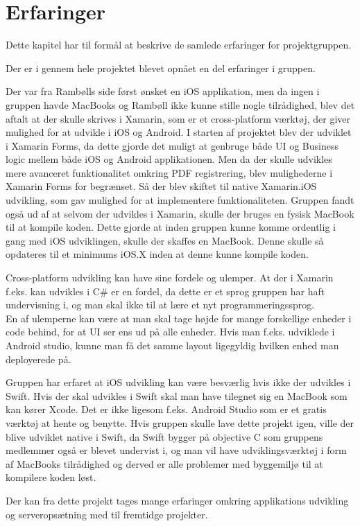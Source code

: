 \chapter{Erfaringer}
Dette kapitel har til formål at beskrive de samlede erfaringer for projektgruppen. 

Der er i gennem hele projektet blevet opnået en del erfaringer i gruppen.

Der var fra Rambølls side først ønsket en iOS applikation, men da ingen i gruppen havde MacBooks og Rambøll ikke kunne stille nogle tilrådighed, blev det aftalt at der skulle skrives i Xamarin, som er et cross-platform værktøj, der giver mulighed for at udvikle i iOS og Android.
I starten af projektet blev der udviklet i Xamarin Forms, da dette gjorde det muligt at genbruge både UI og Business logic mellem både iOS og Android applikationen. Men da der skulle udvikles mere avanceret funktionalitet omkring PDF registrering, blev mulighederne i Xamarin Forms for begrænset\cite{Forms}. Så der blev skiftet til native Xamarin.iOS udvikling, som gav mulighed for at implementere funktionaliteten.
Gruppen fandt også ud af at selvom der udvikles i Xamarin, skulle der bruges en fysisk MacBook til at kompile koden. Dette gjorde at inden gruppen kunne komme ordentlig i gang med iOS udviklingen, skulle der skaffes en MacBook. Denne skulle så opdateres til et minimums iOS.X inden at denne kunne kompile koden.

Cross-platform udvikling kan have sine fordele og ulemper. At der i Xamarin f.eks. kan udvikles i C\# er en fordel, da dette er et sprog gruppen har haft undervisning i, og man skal ikke til at lære et nyt programmeringssprog. \\
En af ulemperne kan være at man skal tage højde for mange forskellige enheder i code behind, for at UI ser ens ud på alle enheder. Hvis man f.eks. udviklede i Android studio, kunne man få det samme layout ligegyldig hvilken enhed man deployerede på.

Gruppen har erfaret at iOS udvikling kan være besværlig hvis ikke der udvikles i Swift\cite{Swift}. Hvis der skal udvikles i Swift skal man have tilegnet sig en MacBook som kan kører Xcode\cite{Xcode}. Det er ikke ligesom f.eks. Android Studio som er et gratis værktøj at hente og benytte.
Hvis gruppen skulle lave dette projekt igen, ville der blive udviklet native i Swift, da Swift bygger på objective C som gruppens medlemmer også er blevet undervist i, og man vil have udviklingsværktøj i form af MacBooks tilrådighed og derved er alle problemer med byggemiljø til at kompilere koden løst.

Der kan fra dette projekt tages mange erfaringer omkring applikations udvikling og serveropsætning med til fremtidge projekter. \\


